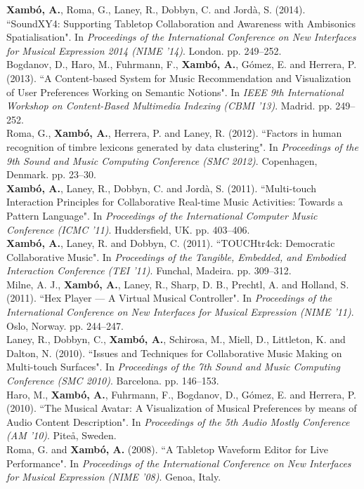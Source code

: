 \documentclass[10pt, a4paper]{article}
\newcommand{\years}[1]{\marginnote{\scriptsize #1}}
\begin{document}
\years{2014}\textbf{Xambó, A.}, Roma, G., Laney, R., Dobbyn, C. and Jordà, S. (2014). “SoundXY4: Supporting Tabletop Collaboration and Awareness with Ambisonics Spatialisation". In \emph{Proceedings of the International Conference on New Interfaces for Musical Expression 2014 (NIME '14)}. London. pp. 249--252.\\
\years{2013}Bogdanov, D., Haro, M., Fuhrmann, F., \textbf{Xambó, A.}, Gómez, E. and Herrera, P. (2013). “A Content-based System for Music Recommendation and Visualization of User Preferences Working on Semantic Notions". In \emph{IEEE 9th International Workshop on Content-Based Multimedia Indexing (CBMI '13)}. Madrid. pp. 249--252.\\
\years{2012}Roma, G., \textbf{Xambó, A.}, Herrera, P. and Laney, R. (2012). “Factors in human recognition of timbre lexicons generated by data clustering". In \emph{Proceedings of the 9th Sound and Music Computing Conference (SMC 2012)}. Copenhagen, Denmark. pp. 23--30.\\
\years{2011c}\textbf{Xambó, A.}, Laney, R., Dobbyn, C. and Jordà, S. (2011). “Multi-touch Interaction Principles for Collaborative Real-time Music Activities: Towards a Pattern Language". In \emph{Proceedings of the International Computer Music Conference (ICMC '11)}. Huddersfield, UK. pp. 403--406.\\
\years{2011b}\textbf{Xambó, A.}, Laney, R. and Dobbyn, C. (2011). “TOUCHtr4ck: Democratic Collaborative Music". In \emph{Proceedings of the Tangible, Embedded, and Embodied Interaction Conference (TEI '11)}. Funchal, Madeira. pp. 309--312.\\
\years{2011a}Milne, A. J., \textbf{Xambó, A.}, Laney, R., Sharp, D. B., Prechtl, A. and Holland, S. (2011). “Hex Player — A Virtual Musical Controller". In \emph{Proceedings of the International Conference on New Interfaces for Musical Expression (NIME '11)}. Oslo, Norway. pp. 244--247.\\
\years{2010b}Laney, R., Dobbyn, C., \textbf{Xambó, A.}, Schirosa, M., Miell, D., Littleton, K. and Dalton, N. (2010). “Issues and Techniques for Collaborative Music Making on Multi-touch Surfaces". In \emph{Proceedings of the 7th Sound and Music Computing Conference (SMC 2010)}. Barcelona. pp. 146–153.\\
\years{2010a}Haro, M., \textbf{Xambó, A.}, Fuhrmann, F., Bogdanov, D., Gómez, E. and Herrera, P. (2010). “The Musical Avatar: A Visualization of Musical Preferences by means of Audio Content Description". In \emph{Proceedings of the 5th Audio Mostly Conference (AM '10)}. Piteå, Sweden.\\
\years{2008}Roma, G. and \textbf{Xambó, A.} (2008). “A Tabletop Waveform Editor for Live Performance". In \emph{Proceedings of the International Conference on New Interfaces for Musical Expression (NIME '08)}. Genoa, Italy.\\
\end{document}
